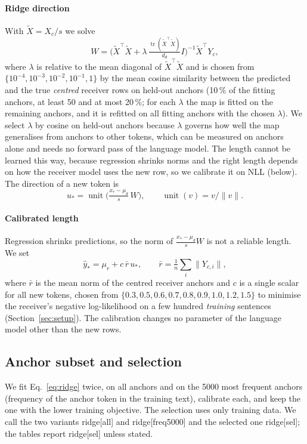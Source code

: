 \documentclass[preprint,12pt]{elsarticle}
\DeclareMathOperator{\dirn}{unit}
\DeclareMathOperator{\tr}{tr}
\begin{document}
\paragraph{Ridge direction} With $\tilde X=X_c/s$ we solve
\begin{equation}
W=\bigl(\tilde X^\top\tilde X+\lambda\,\tfrac{\tr(\tilde X^\top\tilde X)}{d_d}I\bigr)^{-1}\tilde X^\top Y_c ,
\label{eq:ridge}
\end{equation}
where $\lambda$ is relative to the mean diagonal of $\tilde X^\top\tilde X$ and is chosen from $\{10^{-4},10^{-3},10^{-2},10^{-1},1\}$ by the mean cosine similarity between the predicted and the true \emph{centred} receiver rows on held-out anchors (10\,\% of the fitting anchors, at least 50 and at most 20\,\%; for each $\lambda$ the map is fitted on the remaining anchors, and it is refitted on all fitting anchors with the chosen $\lambda$). We select $\lambda$ by cosine on held-out anchors because $\lambda$ governs how well the map generalises from anchors to other tokens, which can be measured on anchors alone and needs no forward pass of the language model. The length cannot be learned this way, because regression shrinks norms and the right length depends on how the receiver model uses the new row, so we calibrate it on NLL (below). The direction of a new token is
\begin{equation}
u_*=\dirn\!\bigl(\tfrac{x_*-\mu_d}{s}\,W\bigr),\qquad \dirn(v)=v/\|v\|.
\label{eq:dir}
\end{equation}

\paragraph{Calibrated length} Regression shrinks predictions, so the norm of $\tfrac{x_*-\mu_d}{s}W$ is not a reliable length. We set
\begin{equation}
\hat y_*=\mu_r+c\,\bar r\,u_*,\qquad \bar r=\tfrac1n\sum_i\|Y_{c,i}\|,
\label{eq:row}
\end{equation}
where $\bar r$ is the mean norm of the centred receiver anchors and $c$ is a single scalar for all new tokens, chosen from $\{0.3,0.5,0.6,0.7,0.8,0.9,1.0,1.2,1.5\}$ to minimise the receiver's negative log-likelihood on a few hundred \emph{training} sentences (Section~\ref{sec:setup}). The calibration changes no parameter of the language model other than the new rows.

\subsection{Anchor subset and selection}
We fit Eq.~\eqref{eq:ridge} twice, on all anchors and on the 5000 most frequent anchors (frequency of the anchor token in the training text), calibrate each, and keep the one with the lower training objective. The selection uses only training data. We call the two variants ridge[all] and ridge[freq5000] and the selected one ridge[sel]; the tables report ridge[sel] unless stated.
\end{document}
